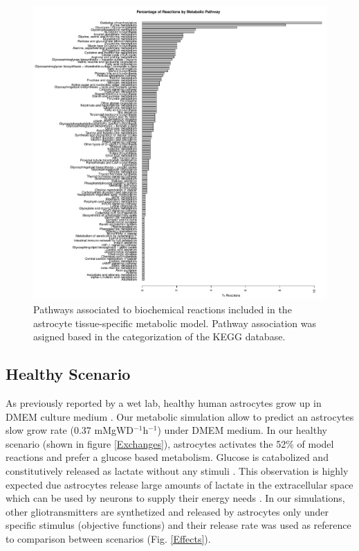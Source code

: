 \begin{figure}
\begin{center}
\includegraphics[width=\textwidth]{neuroprotective/Pathways}
\end{center}
\caption{Pathways associated to biochemical reactions included in the astrocyte tissue-specific metabolic model. Pathway association was asigned based in the categorization of the KEGG database.}
\label{Pathways}
\end{figure}

\subsection*{Healthy Scenario}
As previously reported by a wet lab, healthy human astrocytes grow up in DMEM culture medium \cite{Das2010}. Our metabolic simulation allow to predict an astrocytes slow grow rate  (0.37 mMgWD$^{-1}$h$^{-1}$) under DMEM medium. In our healthy scenario (shown in figure \ref{Exchanges}), astrocytes activates the 52\% of model reactions and prefer a glucose based metabolism. Glucose is catabolized and constitutively released as lactate without any stimuli \cite{LeFoll2016}. This observation is highly expected due astrocytes release large amounts of lactate in the extracellular space which can be used by neurons to supply their energy needs \cite{Allaman2011}.  In our simulations, other gliotransmitters are synthetized and released by astrocytes only under specific stimulus (objective functions) and their release rate was used as reference to comparison between scenarios (Fig. \ref{Effects}). 

